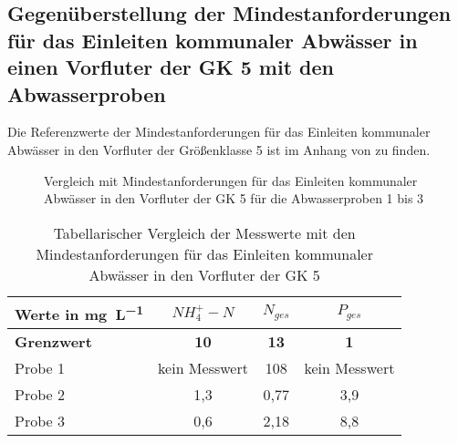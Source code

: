 \subsection*{Gegenüberstellung der Mindestanforderungen für das Einleiten kommunaler Abwässer in einen Vorfluter der GK 5 mit den Abwasserproben}
Die Referenzwerte der Mindestanforderungen für das Einleiten kommunaler Abwässer in den Vorfluter der Größenklasse 5 ist im Anhang von \cite[S. 29]{Skript} zu finden.
\begin{figure}[h!]
	\caption{Vergleich mit Mindestanforderungen für das Einleiten kommunaler Abwässer in den Vorfluter der GK 5 für die Abwasserproben 1 bis 3}
	\label{Balkendiagramm}
\end{figure}
\FloatBarrier
{}

\renewcommand{\arraystretch}{1.2}
\begin{table}[h!]
	\centering
	\caption{Tabellarischer Vergleich der Messwerte mit den Mindestanforderungen für das Einleiten kommunaler Abwässer in den Vorfluter der GK 5}
	\label{tab_vgl}
	\begin{tabulary}{1.2\textwidth}{l|C|C|C}
		\hline
		Werte in \si{\milli\gram\per\liter} & \textbf{$NH_4^+-N$} & \textbf{$N_{ges}$}&\textbf{$P_{ges}$}\\
		\hline
		\textbf{Grenzwert} & \textbf{10} & \textbf{13} & \textbf{1} \\
		\hline
		Probe 1 & {\footnotesize kein Messwert\protect\footnotemark[5]} & 108 & {\footnotesize kein Messwert\protect\footnotemark[5]} \\
		Probe 2 & 1,3 & 0,77 & 3,9 \\
		Probe 3 & 0,6 & 2,18 & 8,8 \\
		\hline
	\end{tabulary}
\end{table}
\FloatBarrier

